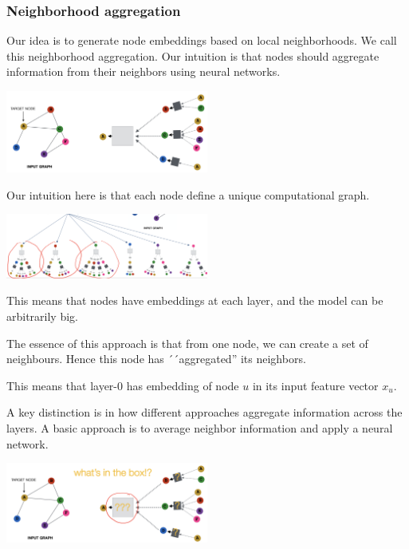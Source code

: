 \subsubsection{Neighborhood aggregation}
    
    Our idea is to generate node embeddings based on local neighborhoods. We call this neighborhood aggregation. Our intuition is that nodes should aggregate information from their neighbors using neural networks. 
    
    \begin{center}
        \includegraphics[width=0.5\textwidth]{images/graphfriends.png}
    \end{center}
    
    Our intuition here is that each node define a unique computational graph. 
    
       \begin{center}
        \includegraphics[width=0.5\textwidth]{images/compgraph.png}
    \end{center}
    
    This means that nodes have embeddings at each layer, and the model can be arbitrarily big. 
    
    The essence of this approach is that from one node, we can create a set of neighbours. Hence this node has ´´aggregated'' its neighbors. 
    
    This means that layer-0 has embedding of node $u$ in its input feature vector $x_u$. 
    
    A key distinction is in how different approaches aggregate information across the layers. A basic approach is to average neighbor information and apply a neural network. 
    
           \begin{center}
        \includegraphics[width=0.5\textwidth]{images/whatsinthebox.png}
    \end{center}
    
